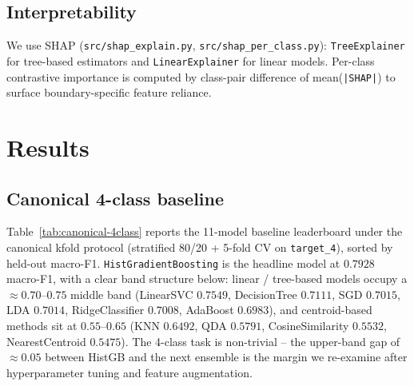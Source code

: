 \documentclass[11pt,a4paper]{article}
\begin{document}
\subsection{Interpretability}

We use SHAP (\texttt{src/shap\_explain.py}, \texttt{src/shap\_per\_class.py}):
\texttt{TreeExplainer} for tree-based estimators and \texttt{LinearExplainer} for
linear models. Per-class contrastive importance is computed by class-pair difference
of mean(\texttt{|SHAP|}) to surface boundary-specific feature reliance.

\section{Results}

\subsection{Canonical 4-class baseline}
\label{sec:canonical-4class}

Table~\ref{tab:canonical-4class} reports the 11-model baseline leaderboard
under the canonical kfold protocol (stratified 80/20 + 5-fold CV on
\texttt{target\_4}), sorted by held-out macro-F1. \texttt{HistGradientBoosting}
is the headline model at $0.7928$ macro-F1, with a clear band structure below:
linear / tree-based models occupy a $\approx 0.70$--$0.75$ middle band
(LinearSVC $0.7549$, DecisionTree $0.7111$, SGD $0.7015$, LDA $0.7014$,
RidgeClassifier $0.7008$, AdaBoost $0.6983$), and centroid-based methods sit
at $0.55$--$0.65$ (KNN $0.6492$, QDA $0.5791$, CosineSimilarity $0.5532$,
NearestCentroid $0.5475$). The 4-class task is non-trivial -- the
upper-band gap of $\approx 0.05$ between HistGB and the next ensemble is the
margin we re-examine after hyperparameter tuning and feature augmentation.
\end{document}
